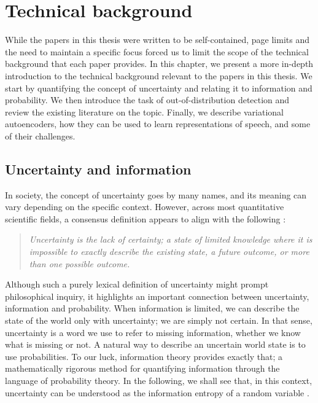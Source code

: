

\chapter[technical background]{Technical background}\label{chp:technical-background}

While the papers in this thesis were written to be self-contained, page limits and the need to maintain a specific focus forced us to limit the scope of the technical background that each paper provides. In this chapter, we present a more in-depth introduction to the technical background relevant to the papers in this thesis. 
We start by quantifying the concept of uncertainty and relating it to information and probability. We then introduce the task of out-of-distribution detection and review the existing literature on the topic. 
Finally, we describe variational autoencoders, how they can be used to learn representations of speech, and some of their challenges. %


\section{Uncertainty and information} \label{sec:uncertainty-information-theory}

In society, the concept of uncertainty goes by many names, and its meaning can vary depending on the specific context. However, across most quantitative scientific fields, a consensus definition appears to align with the following \parencite{hubbard_how_2014}:
%
\begin{quote}
    \centering\itshape
    Uncertainty is the lack of certainty; a state of limited knowledge where it is impossible to exactly describe the existing state, a future outcome, or more than one possible outcome.
\end{quote}
%
Although such a purely lexical definition of uncertainty might prompt philosophical inquiry, it highlights an important connection between uncertainty, information and probability. When information is limited, we can describe the state of the world only with uncertainty; we are simply not certain. In that sense, uncertainty is a word we use to refer to missing information, whether we know what is missing or not. 
A natural way to describe an uncertain world state is to use probabilities. To our luck, information theory provides exactly that; a mathematically rigorous method for quantifying information through the language of probability theory. In the following, we shall see that, in this context, uncertainty can be understood as the information entropy of a random variable \parencite{mackay_information_2003}. 


